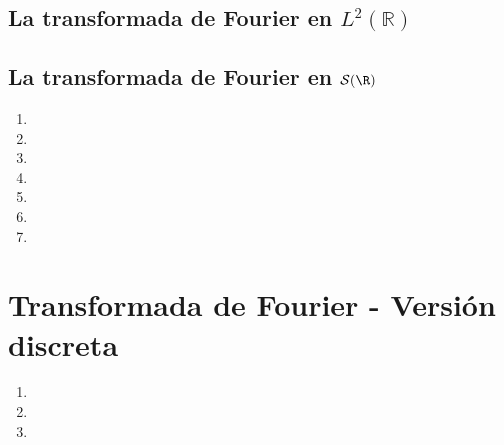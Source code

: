 \documentclass{article}
\begin{document}
\subsection{La transformada de Fourier en \texorpdfstring{$L^{2}(\mathbb{R})$}{}}



\subsection{La transformada de Fourier en \texorpdfstring{$\mathcal{S}(\R)$}{}}
\begin{enumerate}
    \item 
    \item 
    \item 
    \item 
    \item 
    \item 
    \item 
\end{enumerate}

\section{Transformada de Fourier - Versión discreta}
\begin{enumerate}
    \item 
    \item 
    \item 
\end{enumerate}

\end{document}
